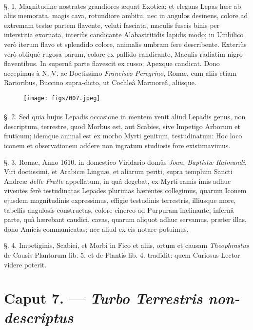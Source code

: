 \documentclass[a4paper, 11pt, oneside, polutonikogreek, german]{article}
\begin{document}
\paragraph{}
§. 1. Magnitudine nostrates grandiores æquat Exotica; et elegans Lepas hæc ab aliis memorata, magis cava, rotundiore ambitu, nec in angulos desinens, colore ad extremam testæ partem flavente, veluti fasciata, maculis fuscis binis per interstitia exornata, interiùs candicante Alabastritidis lapidis modo; in Umbilico verò iterum flavo et splendido colore, animalis umbram fere describente. Exteriùs verò obliquè rugosa parum, colore ex pallido candicante, Maculis radiatim nigro-flaventibus. In supernâ parte flavescit ex russo; Apexque candicat. Dono accepimus à N. V. ac Doctissimo \emph{Francisco Peregrino}, Romæ, cum aliis etiam Rarioribus, Buccino supra-dicto, ut Cochleâ Marmoreâ, aliisque.

\begin{figure}[H]
\centering
\texttt{[image: figs/007.jpeg]}

\end{figure}
\paragraph{}
§. 2. Sed quia hujus Lepadis occasione in mentem venit aliud Lepadis genus, non descriptum, terrestre, quod Morbus est, aut Scabies, sive Impetigo Arborum et fruticum; idemque animal est ex morbo Myrti genitum, testudinatum: Hoc loco iconem et observationem addere non ingratum studiosis fore existimavimus.

§. 3. Romæ, Anno 1610. in domestico Viridario domûs \emph{Joan. Baptistæ Raimundi}, Viri doctissimi, et Arabicæ Linguæ, et aliarum periti, supra templum Sancti Andreæ \emph{delle Fratte} appellatum, in quâ degebat, ex Myrti ramis imis adhuc viventes ferè testudinatas Lepades plurimas hærentes collegimus, quarum Iconem ejusdem magnitudinis expressimus, effigie testudinis terrestris, illiusque more, tabellis angulosis constructas, colore cinereo ad Purpuram inclinante, infernâ parte, quâ hærebant caudici, cavas, quarum aliquot adhuc servamus, præter illas, dono Amicis communicatas; nec aliud ex eis notare potuimus.

§. 4. Impetiginis, Scabiei, et Morbi in Fico et aliis, ortum et causam \emph{Theophrastus} de Causis Plantarum lib. 5. et de Plantis lib. 4. tradidit: quem Curiosus Lector videre poterit.

\section{Caput 7. --- \emph{Turbo Terrestris non-descriptus}}
\end{document}

